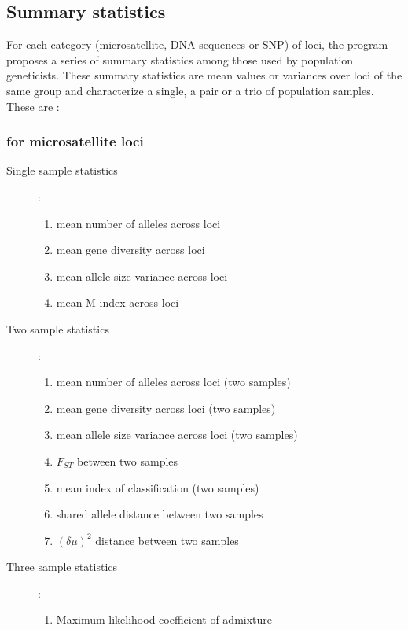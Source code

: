 \subsection{Summary statistics}

For each category (microsatellite, DNA sequences or SNP) of loci,
the program proposes a series of summary statistics among those used
by population geneticists. These summary statistics are mean values
or variances over loci of the same group and characterize a single,
a pair or a trio of population samples. These are :


\subsubsection{for microsatellite loci}
\begin{description}
\item [{Single sample statistics}] :

\begin{enumerate}
\item mean number of alleles across loci
\item mean gene diversity across loci \citep{N1987}
\item mean allele size variance across loci
\item mean M index across loci \citep{GW2001,Ex2005}
\end{enumerate}
\item [{Two sample statistics}] :

\begin{enumerate}
\item mean number of alleles across loci (two samples)
\item mean gene diversity across loci (two samples)
\item mean allele size variance across loci (two samples)
\item $F_{ST}$ between two samples \citep{WC1984}
\item mean index of classification (two samples) \citep{RM1997,PC2007}
\item shared allele distance between two samples \citep{CJ1993}
\item $(\delta\mu)^{2}$ distance between two samples \citep{GL1995}
\end{enumerate}
\item [{Three sample statistics}] :

\begin{enumerate}
\item Maximum likelihood coefficient of admixture \citep{CF2004}
\end{enumerate}
\end{description}

